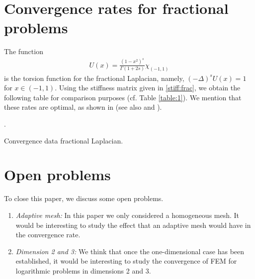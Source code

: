 \documentclass[11 pt]{article}
\numberwithin{equation}{section}
\begin{document}
\section{Convergence rates for fractional problems}
 
The function
\begin{align*}
 U(x)=\frac{(1-x^2)^s}{\Gamma(1+2s)}\chi_{(-1,1)}
\end{align*}
is the torsion function for the fractional Laplacian, namely, $(-\Delta)^s U(x)=1$ for $x\in (-1,1)$.  Using the stiffness matrix given in \eqref{stiff:frac}, we obtain the following table for comparison purposes (cf. Table \ref{table:1}).  We mention that these rates are optimal, as shown in \cite{Bor17} (see also \cite[Section 5]{AB17} and \cite[Section 5]{BHS19}).
 
 
{\color{white}.}
\begin{table}[h!]
\centering
%
\data
%
%
\pgfplotstabletypeset[clear infinite, empty cells with={\ensuremath{-}},
every head row/.style={
before row=\toprule,after row=\midrule},
every last row/.style={
after row=\bottomrule},
]{\data}
%
\caption{Convergence data fractional Laplacian.}
\label{table:frac_lap}
\end{table}
 

 \section{Open problems}\label{sec:o:p}

 To close this paper, we discuss some open problems.
 \begin{enumerate}
    \item \emph{Adaptive mesh:} In this paper we only considered a homogeneous mesh.  It would be interesting to study the effect that an adaptive mesh would have in the convergence rate.
     \item \emph{Dimension 2 and 3:} We think that once the one-dimensional case has been established, it would be interesting to study the convergence of FEM for logarithmic problems in dimensions 2 and 3.
 \end{enumerate}
\end{document}
